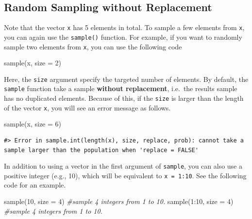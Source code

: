 \documentclass[
]{book}
\newenvironment{Shaded}{\begin{snugshade}}{\end{snugshade}}
\newcommand{\AttributeTok}[1]{\textcolor[rgb]{0.77,0.63,0.00}{#1}}
\newcommand{\CommentTok}[1]{\textcolor[rgb]{0.56,0.35,0.01}{\textit{#1}}}
\newcommand{\DecValTok}[1]{\textcolor[rgb]{0.00,0.00,0.81}{#1}}
\newcommand{\FunctionTok}[1]{\textcolor[rgb]{0.00,0.00,0.00}{#1}}
\newcommand{\NormalTok}[1]{#1}
\newcommand{\SpecialCharTok}[1]{\textcolor[rgb]{0.00,0.00,0.00}{#1}}
\begin{document}
\hypertarget{random-sampling-without-replacement}{%
\subsection{Random Sampling without Replacement}\label{random-sampling-without-replacement}}

Note that the vector \texttt{x} has 5 elements in total. To sample a few elements from \texttt{x}, you can again use the \texttt{sample()} function. For example, if you want to randomly sample two elements from \texttt{x}, you can use the following code

\begin{Shaded}
\begin{Highlighting}[]
\FunctionTok{sample}\NormalTok{(x, }\AttributeTok{size =} \DecValTok{2}\NormalTok{) }
\end{Highlighting}
\end{Shaded}

Here, the \texttt{size} argument specify the targeted number of elements. By default, the \texttt{sample} function take a sample \textbf{without replacement}, i.e.~the results sample has no duplicated elements. Because of this, if the \texttt{size} is larger than the length of the vector \texttt{x}, you will see an error message as follows.

\begin{Shaded}
\begin{Highlighting}[]
\FunctionTok{sample}\NormalTok{(x, }\AttributeTok{size =} \DecValTok{6}\NormalTok{)}
\end{Highlighting}
\end{Shaded}

\begin{verbatim}
#> Error in sample.int(length(x), size, replace, prob): cannot take a sample larger than the population when 'replace = FALSE'
\end{verbatim}

In addition to using a vector in the first argument of \texttt{sample}, you can also use a positive integer (e.g., 10), which will be equivalent to \texttt{x\ =\ 1:10}. See the following code for an example.

\begin{Shaded}
\begin{Highlighting}[]
\FunctionTok{sample}\NormalTok{(}\DecValTok{10}\NormalTok{, }\AttributeTok{size =} \DecValTok{4}\NormalTok{)   }\CommentTok{\#sample 4 integers from 1 to 10.}
\FunctionTok{sample}\NormalTok{(}\DecValTok{1}\SpecialCharTok{:}\DecValTok{10}\NormalTok{, }\AttributeTok{size =} \DecValTok{4}\NormalTok{) }\CommentTok{\#sample 4 integers from 1 to 10.}
\end{Highlighting}
\end{Shaded}
\end{document}
